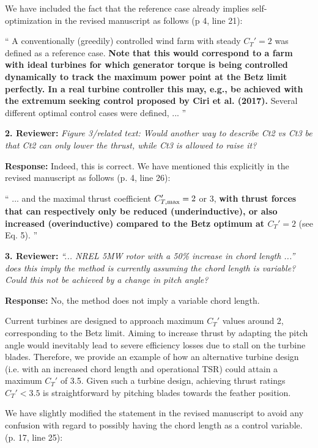 \documentclass[]{article}
\begin{document}
We have included the fact that the reference case already implies self-optimization in the revised manuscript as follows (p 4, line 21): 

``
A conventionally (greedily) controlled wind farm with steady $C_T' = 2$ was defined as a reference case. \textbf{Note that this would correspond to a farm with ideal turbines for which generator torque is being controlled dynamically to track the maximum power point at the Betz limit perfectly. In a real turbine controller this may, e.g., be achieved with the extremum seeking control proposed by Ciri et al. (2017).} Several different optimal control cases were defined, ...
''

\dotfill

\textbf{2. Reviewer:} \textit{Figure 3/related text: Would another way to describe Ct2 vs Ct3 be that Ct2 can only lower the thrust, while Ct3 is allowed to raise it?}

\textbf{Response:} Indeed, this is correct. We have mentioned this explicitly in the revised manuscript as follows (p. 4, line 26):

``
... and the maximal thrust coefficient $C_{T,\rm max}' = 2$ or 3, \textbf{with thrust forces that can respectively only be reduced (underinductive), or also increased (overinductive) compared to the Betz optimum at $C_T' = 2$} (see Eq. 5). 
''

\dotfill

\textbf{3. Reviewer:} \textit{``... NREL 5MW rotor with a 50\% increase in chord length ...'' does this imply the method is currently assuming the chord length is variable? Could this not be achieved by a change in pitch angle?}

\textbf{Response:} No, the method does not imply a variable chord length. 

Current turbines are designed to approach maximum $C_T'$ values around 2, corresponding to the Betz limit. Aiming to increase thrust by adapting the pitch angle would inevitably lead to severe efficiency losses due to stall on the turbine blades. Therefore, we provide an example of how an alternative turbine design (i.e. with an increased chord length and operational TSR) could attain a maximum $C_T'$ of 3.5. Given such a turbine design, achieving thrust ratings $C_T' < 3.5$ is straightforward by pitching blades towards the feather position. 

We have slightly modified the statement in the revised manuscript to avoid any confusion with regard to possibly having the chord length as a control variable. (p. 17, line 25):
\end{document}

